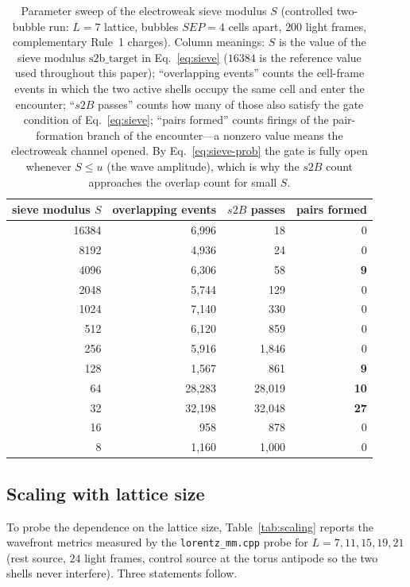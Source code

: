 \documentclass{ijuc}
\begin{document}
\begin{table}[h]
\centering
\caption{Parameter sweep of the electroweak sieve modulus $S$ (controlled two-bubble run: $L=7$ lattice, bubbles $SEP=4$ cells apart, $200$ light frames, complementary Rule~1 charges).  Column meanings: $S$ is the value of the sieve modulus $\mathrm{s2b\_target}$ in Eq.~\eqref{eq:sieve} ($16384$ is the reference value used throughout this paper); ``overlapping events'' counts the cell-frame events in which the two active shells occupy the same cell and enter the encounter; ``$s2B$ passes'' counts how many of those also satisfy the gate condition of Eq.~\eqref{eq:sieve}; ``pairs formed'' counts firings of the pair-formation branch of the encounter---a nonzero value means the electroweak channel opened.  By Eq.~\eqref{eq:sieve-prob} the gate is fully open whenever $S\le u$ (the wave amplitude), which is why the $s2B$ count approaches the overlap count for small $S$.}
\label{tab:sieve}
\begin{tabular}{|r|r|r|r|}
\hline
sieve modulus $S$ & overlapping events & $s2B$ passes & pairs formed\\
\hline
16384 & 6{,}996 & 18 & 0\\
8192 & 4{,}936 & 24 & 0\\
4096 & 6{,}306 & 58 & \textbf{9}\\
2048 & 5{,}744 & 129 & 0\\
1024 & 7{,}140 & 330 & 0\\
512 & 6{,}120 & 859 & 0\\
256 & 5{,}916 & 1{,}846 & 0\\
128 & 1{,}567 & 861 & \textbf{9}\\
64 & 28{,}283 & 28{,}019 & \textbf{10}\\
32 & 32{,}198 & 32{,}048 & \textbf{27}\\
16 & 958 & 878 & 0\\
8 & 1{,}160 & 1{,}000 & 0\\
\hline
\end{tabular}
\end{table}
\subsection{Scaling with lattice size}\label{subsec:scaling}
To probe the dependence on the lattice size, Table~\ref{tab:scaling} reports the wavefront metrics measured by the \texttt{lorentz\_mm.cpp} probe for $L=7,11,15,19,21$ (rest source, $24$ light frames, control source at the torus antipode so the two shells never interfere).  Three statements follow.
\end{document}
